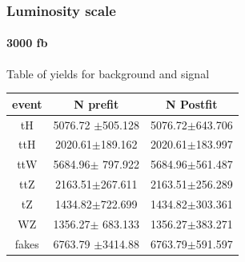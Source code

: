 \documentclass[11pt]{beamer}
\begin{document}
\begin{frame}
\frametitle{Luminosity scale}
\framesubtitle{3000 fb}
Table of yields for background and signal
\begin{table}
	\begin{tabular}{|c|c|c|}
		\hline
event  & N prefit    & N Postfit \\
\hline
tH & 5076.72 $\pm$505.128 & 5076.72$\pm$643.706\\
\hline
ttH  & 2020.61$\pm$189.162 & 2020.61$\pm$183.997\\
\hline
ttW  & 5684.96$\pm$  797.922& 5684.96$\pm$561.487\\
\hline
ttZ  & 2163.51$\pm$267.611 & 2163.51$\pm$256.289\\
\hline
tZ & 1434.82$\pm$722.699 & 1434.82$\pm$303.361\\
\hline
WZ & 1356.27$\pm$ 683.133& 1356.27$\pm$383.271\\
\hline
fakes  & 6763.79 $\pm$3414.88 & 6763.79$\pm$591.597\\
	\hline
	\end{tabular}
\end{table}
\end{frame}
\end{document}
